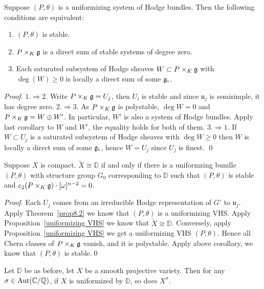 \documentclass[aspectratio=169, 10pt]{beamer}
\theoremstyle{definition}
\theoremstyle{example}
\begin{document}
	\begin{frame}
		\begin{corollary}\label{cor9.4}
			Suppose $(P,\theta)$ is a uniformizing system of Hodge bundles. Then the following conditions are equivalent:
			\begin{enumerate}
				\item $(P,\theta)$ is stable.
				\item $P\times_K \mathfrak{g}$ is a direct sum of stable systems of degree zero.
				\item Each saturated subsystem of Hodge sheaves $W\subset P\times_K \mathfrak{g}$ with $\deg(W)\geq 0$ is locally a direct sum of some $\mathfrak{g}_i$. 
			\end{enumerate}
		\end{corollary}
		\textit{Proof.}
		$1.\Rightarrow 2.$ Write $P\times_K \mathfrak{g}=U_j$, then $U_i$ is stable and since $\mathfrak{u}_j$ is semisimple, it has degree zero. $2.\Rightarrow 3.$ As $P\times_K \mathfrak{g}$ is polystable, $\deg W=0$ and $P\times_K \mathfrak{g}=W\oplus W'$. In particular, $W'$ is also a system of Hodge bundles. Apply last corollary to $W$ and $W'$, the equality holds for both of them. $3.\Rightarrow 1.$ If $W\subset U_j$ is a saturated subsystem of Hodge sheaves with $\deg W\geq 0$ then $W$ is locally a direct sum of some $\mathfrak{g}_i$, hence $W=U_j$ since $U_j$ is finest. \hfill \qed
	\end{frame}
	\begin{frame}
		\begin{theorem}
		Suppose $X$ is compact. $\widetilde{X}\cong \mathbb{D}$ if and only if there is a uniformzing bundle $(P,\theta)$ with structure group $G_0$ corresponding to $\mathbb{D}$ such that $(P,\theta)$ is stable and $\operatorname{c}_2(P\times_K \mathfrak{g})\cdot [\omega]^{n-2}=0$.
	\end{theorem}
	\noindent \textit{Proof.}
	Each $U_j$ comes from an irreducible Hodge representation of $G'$ to $\mathfrak{u}_j$. Apply Theorem~\ref{prop8.2} we know that $(P,\theta)$ is a uniformizing VHS. Apply Proposition~\ref{uniformizing VHS} we know that $\widetilde{X}\cong \mathbb{D}$. Conversely, apply Proposition~\ref{uniformizing VHS} we get a uniformizing VHS $(P,\theta)$. Hence all Chern classes of $P\times_K \mathfrak{g}$ vanish, and it is polystable. Apply above corollary, we know that $(P,\theta)$ is stable.\hfill \qed
	\begin{corollary}\label{cor9.5}
		Let $\mathbb{D}$ be as before, let $X$ be a smooth projective variety. Then for any $\sigma\in \operatorname{Aut}(\mathbb{C}/\mathbb{Q})$, if $X$ is uniformized by $\mathbb{D}$, so does $X^{\sigma}$.
	\end{corollary}
	\end{frame}
\end{document}
